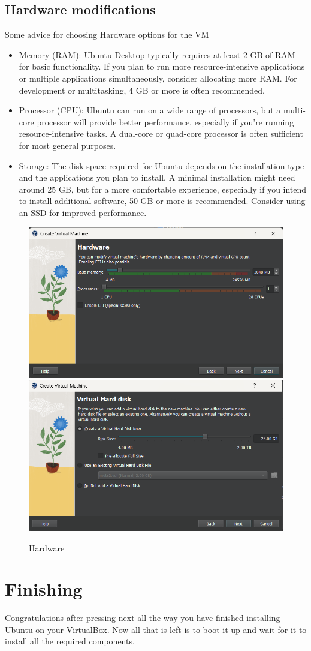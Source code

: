 \documentclass{article}
\begin{document}
    \subsection*{Hardware modifications}
    Some advice for choosing Hardware options for the VM
    \begin{itemize}
        \item Memory (RAM): Ubuntu Desktop typically requires at least 2 GB of RAM for basic functionality. If you plan to run more resource-intensive applications or multiple applications simultaneously, consider allocating more RAM. For development or multitasking, 4 GB or more is often recommended.
        \item Processor (CPU): Ubuntu can run on a wide range of processors, but a multi-core processor will provide better performance, especially if you're running resource-intensive tasks. A dual-core or quad-core processor is often sufficient for most general purposes.
        \item Storage: The disk space required for Ubuntu depends on the installation type and the applications you plan to install. A minimal installation might need around 25 GB, but for a more comfortable experience, especially if you intend to install additional software, 50 GB or more is recommended. Consider using an SSD for improved performance.
    \end{itemize}
    \begin{figure}[H]
        \centering
        \includegraphics{Pics/Hardware_Modification_Window.png}
        \includegraphics{Pics/Hardware_Modification_Window_Next.png}
        \caption{Hardware}
    \end{figure}
    \section*{Finishing}
    Congratulations after pressing next all the way you have finished installing Ubuntu on your VirtualBox. Now all that is left is to boot it up and wait for it to install all the required components.
\end{document}
